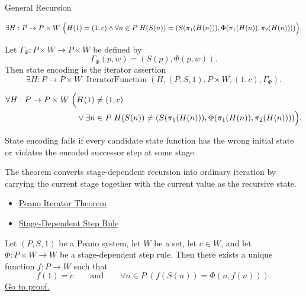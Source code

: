 \begin{topicbox}{General Recursion}
\begin{remark*}
\[
\exists H:P\to P\times W\;
\Bigl(H(1)=(1,c)\land
\forall n\in P\;
H(S(n))=(S(\pi_1(H(n))),\Phi(\pi_1(H(n)),\pi_2(H(n))))\Bigr).
\]
\end{remark*}

\begin{remark*}
Let $\Gamma_\Phi:P\times W\to P\times W$ be defined by
\[
\Gamma_\Phi(p,w)=(S(p),\Phi(p,w)).
\]
Then state encoding is the iterator assertion
\[
\exists H:P\to P\times W\;
\operatorname{IteratorFunction}(H,(P,S,1),P\times W,(1,c),\Gamma_\Phi).
\]
\end{remark*}

\begin{remark*}
\[
\begin{aligned}
\forall H:P\to P\times W\;\Bigl(&
H(1)\neq (1,c)\\
&\lor \exists n\in P\;
H(S(n))\neq(S(\pi_1(H(n))),\Phi(\pi_1(H(n)),\pi_2(H(n))))\Bigr).
\end{aligned}
\]
\end{remark*}

\begin{remark*}
State encoding fails if every candidate state function has the wrong initial
state or violates the encoded successor step at some stage.
\end{remark*}

\begin{remark*}[Interpretation]
The theorem converts stage-dependent recursion into ordinary iteration by
carrying the current stage together with the current value as the recursive
state.
\end{remark*}

\begin{dependencies}
\begin{itemize}
  \item \hyperref[thm:peano-iterator-theorem]{Peano Iterator Theorem}
  \item \hyperref[def:stage-dependent-step-rule]{Stage-Dependent Step Rule}
\end{itemize}
\end{dependencies}

\begin{tcolorbox}[colback=thmbox, colframe=thmborder, arc=2pt,
  left=6pt, right=6pt, top=4pt, bottom=4pt,
  title={\small\textbf{Theorem (General Recursion Theorem)}},
  fonttitle=\small\bfseries]
\begin{theorem}
\label{thm:general-recursion-theorem-for-peano-system}
Let $(P,S,1)$ be a Peano system, let $W$ be a set, let $c\in W$, and let
$\Phi:P\times W\to W$ be a stage-dependent step rule. Then there exists a
unique function $f:P\to W$ such that
\[
f(1)=c
\qquad\text{and}\qquad
\forall n\in P\;(f(S(n))=\Phi(n,f(n))).
\]
\hyperref[prf:general-recursion-theorem-for-peano-system]{Go to proof.}
\end{theorem}
\end{tcolorbox}


\end{topicbox}
